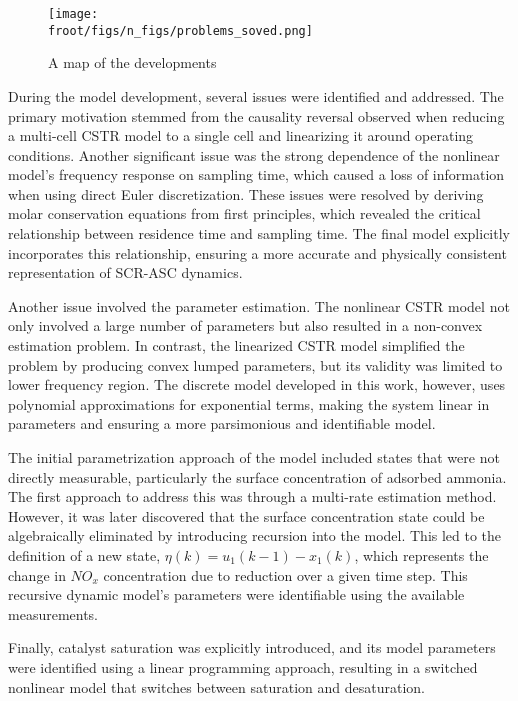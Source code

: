 \begin{figure}[H]
        \centering
        \texttt{[image: \\froot/figs/n\_figs/problems\_soved.png]}
        \caption{A map of the developments}
\end{figure}

During the model development, several issues were identified and addressed. The primary motivation stemmed from the
causality reversal observed when reducing a multi-cell CSTR model to a single cell and linearizing it around operating
conditions. Another significant issue was the strong dependence of the nonlinear model's frequency response on sampling
time, which caused a loss of information when using direct Euler discretization. These issues were resolved by deriving
molar conservation equations from first principles, which revealed the critical relationship between residence time and
sampling time. The final model explicitly incorporates this relationship, ensuring a more accurate and physically
consistent representation of SCR-ASC dynamics.

Another issue involved the parameter estimation. The nonlinear CSTR model not only involved a large number of parameters
but also resulted in a non-convex estimation problem. In contrast, the linearized CSTR model simplified the problem by
producing convex lumped parameters, but its validity was limited to lower frequency region. The discrete model developed
in this work, however, uses polynomial approximations for exponential terms, making the system linear in parameters and
ensuring a more parsimonious and identifiable model.

The initial parametrization approach of the model included states that were not directly measurable, particularly the
surface concentration of adsorbed ammonia. The first approach to address this was through a multi-rate estimation
method. However, it was later discovered that the surface concentration state could be algebraically eliminated by
introducing recursion into the model. This led to the definition of a new state, $\eta(k) = u_1(k-1) - x_1(k)$, which
represents the change in $NO_x$ concentration due to reduction over a given time step. This recursive dynamic model's
parameters were identifiable using the available measurements.

Finally, catalyst saturation was explicitly introduced, and its model parameters were identified using a linear
programming approach, resulting in a switched nonlinear model that switches between saturation and desaturation.
